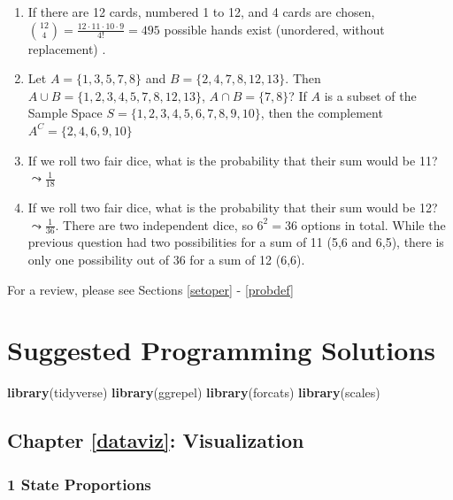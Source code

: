 \documentclass[]{book}
\newenvironment{Shaded}{\begin{snugshade}}{\end{snugshade}}
\newcommand{\KeywordTok}[1]{\textcolor[rgb]{0.13,0.29,0.53}{\textbf{#1}}}
\newcommand{\NormalTok}[1]{#1}
\theoremstyle{definition}
\theoremstyle{definition}
\theoremstyle{definition}
\theoremstyle{remark}
\begin{document}
\begin{enumerate}
\def\labelenumi{\arabic{enumi}.}
\item
  If there are 12 cards, numbered 1 to 12, and 4 cards are chosen, \(\binom{12}{4} = \frac{12\cdot 11\cdot 10\cdot 9}{4!} = 495\) possible hands exist (unordered, without replacement) .
\item
  Let \(A = \{1,3,5,7,8\}\) and \(B = \{2,4,7,8,12,13\}\). Then \(A \cup B = \{1, 2, 3, 4, 5, 7, 8, 12, 13\}\), \(A \cap B = \{7, 8\}\)? If \(A\) is a subset of the Sample Space \(S = \{1,2,3,4,5,6,7,8,9,10\}\), then the complement \(A^C = \{2, 4, 6, 9, 10\}\)
\item
  If we roll two fair dice, what is the probability that their sum would be 11? \(\leadsto \frac{1}{18}\)
\item
  If we roll two fair dice, what is the probability that their sum would be 12? \(\leadsto \frac{1}{36}\). There are two independent dice, so \(6^2 = 36\) options in total. While the previous question had two possibilities for a sum of 11 (5,6 and 6,5), there is only one possibility out of 36 for a sum of 12 (6,6).
\end{enumerate}

For a review, please see Sections \ref{setoper} - \ref{probdef}

\hypertarget{suggested-programming-solutions}{%
\chapter*{Suggested Programming Solutions}\label{suggested-programming-solutions}}

\begin{Shaded}
\begin{Highlighting}[]
\KeywordTok{library}\NormalTok{(tidyverse)}
\KeywordTok{library}\NormalTok{(ggrepel)}
\KeywordTok{library}\NormalTok{(forcats)}
\KeywordTok{library}\NormalTok{(scales)}
\end{Highlighting}
\end{Shaded}

\hypertarget{chapter-refdataviz-visualization}{%
\section{Chapter \ref{dataviz}: Visualization}\label{chapter-refdataviz-visualization}}

\hypertarget{state-proportions}{%
\subsection*{1 State Proportions}\label{state-proportions}}
\end{document}
